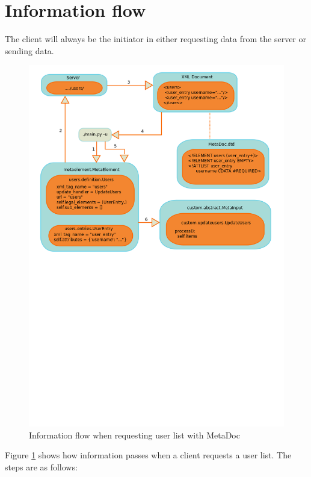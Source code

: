 \newpage
\section{Information flow}
\label{sec:information_flow}

The client will always be the initiator in either requesting data from the
server or sending data. 

\begin{figure}[h!]
    \includegraphics[width=\textwidth]{img/xml_flow}
    \caption{Information flow when requesting user list with MetaDoc}
    \label{fig:information_flow}
\end{figure}

Figure \ref{fig:information_flow} shows how information passes when a client
requests a user list. The steps are as follows:

